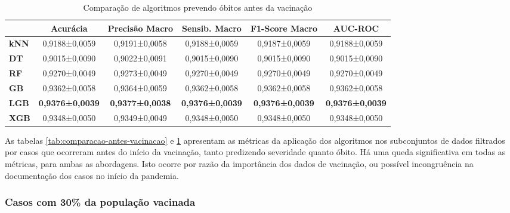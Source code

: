 \begin{table}[H]
  \footnotesize
  \centering
  \begin{tabular}{l|c|c|c|c|c|}
    \cline{2-6}
    \multicolumn{1}{c|}{\textbf{}}     & \textbf{Acurácia}      & \textbf{Precisão Macro} & \textbf{Sensib. Macro} & \textbf{F1-Score Macro} & \textbf{AUC-ROC}       \\ \hline
    \multicolumn{1}{|l|}{\textbf{kNN}} & 0,9188±0,0059          & 0,9191±0,0058           & 0,9188±0,0059          & 0,9187±0,0059           & 0,9188±0,0059          \\ \hline
    \multicolumn{1}{|l|}{\textbf{DT}}  & 0,9015±0,0090          & 0,9022±0,0091           & 0,9015±0,0090          & 0,9015±0,0090           & 0,9015±0,0090          \\ \hline
    \multicolumn{1}{|l|}{\textbf{RF}}  & 0,9270±0,0049          & 0,9273±0,0049           & 0,9270±0,0049          & 0,9270±0,0049           & 0,9270±0,0049          \\ \hline
    \multicolumn{1}{|l|}{\textbf{GB}}  & 0,9362±0,0058          & 0,9364±0,0059           & 0,9362±0,0058          & 0,9362±0,0058           & 0,9362±0,0058          \\ \hline
    \multicolumn{1}{|l|}{\textbf{LGB}} & \textbf{0,9376±0,0039} & \textbf{0,9377±0,0038}  & \textbf{0,9376±0,0039} & \textbf{0,9376±0,0039}  & \textbf{0,9376±0,0039} \\ \hline
    \multicolumn{1}{|l|}{\textbf{XGB}} & 0,9348±0,0050          & 0,9349±0,0049           & 0,9348±0,0050          & 0,9348±0,0050           & 0,9348±0,0050          \\ \hline
  \end{tabular}
  \caption{Comparação de algoritmos prevendo óbitos antes da vacinação}
  \label{tab:comparacao-obito-antes-vacinacao}
\end{table}

As tabelas \ref{tab:comparacao-antes-vacinacao} e \ref{tab:comparacao-obito-antes-vacinacao} apresentam as métricas da aplicação dos algoritmos nos subconjuntos de dados filtrados por casos que ocorreram antes do início da vacinação, tanto predizendo severidade quanto óbito. Há uma queda significativa em todas as métricas, para ambas as abordagens. Isto ocorre por razão da importância dos dados de vacinação, ou possível incongruência na documentação dos casos no início da pandemia.

\subsubsection{Casos com 30\% da população vacinada}
\label{subsub:comparacao-vacinacao-30}

